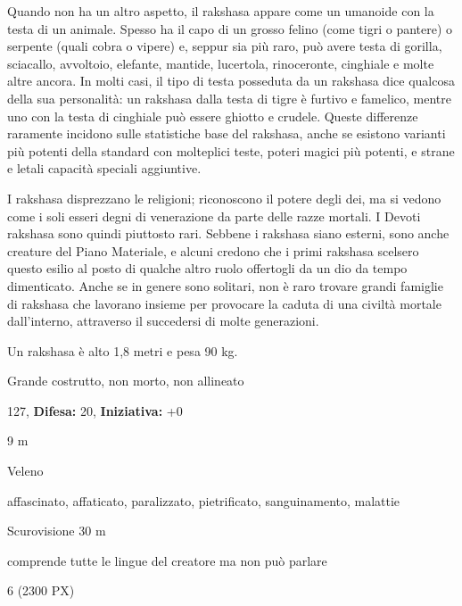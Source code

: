 \begin{multicols}{2}
{Quando non ha un altro aspetto, il rakshasa appare come un umanoide con la testa di un animale. Spesso ha il capo di un grosso felino (come tigri o pantere) o serpente (quali cobra o vipere) e, seppur sia più raro, può avere testa di gorilla, sciacallo, avvoltoio, elefante, mantide, lucertola, rinoceronte, cinghiale e molte altre ancora. In molti casi, il tipo di testa posseduta da un rakshasa dice qualcosa della sua personalità: un rakshasa dalla testa di tigre è furtivo e famelico, mentre uno con la testa di cinghiale può essere ghiotto e crudele. Queste differenze raramente incidono sulle statistiche base del rakshasa, anche se esistono varianti più potenti della standard con molteplici teste, poteri magici più potenti, e strane e letali capacità speciali aggiuntive.

I rakshasa disprezzano le religioni; riconoscono il potere degli dei, ma si vedono come i soli esseri degni di venerazione da parte delle razze mortali. I Devoti rakshasa sono quindi piuttosto rari. Sebbene i rakshasa siano esterni, sono anche creature del Piano Materiale, e alcuni credono che i primi rakshasa scelsero questo esilio al posto di qualche altro ruolo offertogli da un dio da tempo dimenticato. Anche se in genere sono solitari, non è raro trovare grandi famiglie di rakshasa che lavorano insieme per provocare la caduta di una civiltà mortale dall'interno, attraverso il succedersi di molte generazioni.

Un rakshasa è alto 1,8 metri e pesa 90 kg.

\noindent
\begin{description}[noitemsep, topsep=0pt, parsep=0pt, partopsep=0pt, leftmargin=0cm, labelwidth=2.2cm]
	\item[\textbf{Taglia/Tipo:}] Grande costrutto, non morto, non allineato
	\item[\textbf{Caratt.:}] 
	\item[\textbf{Punti Ferita:}] 127,  \textbf{Difesa:} 20,  \textbf{Iniziativa:} +0
	\item[\textbf{Movimento:}] 9 m
	\item[\textbf{Tiri Salvez.:}] 
	\item[\textbf{Imm. Danni:}] Veleno
	\item[\textbf{Immunità:}] affascinato, affaticato, paralizzato, pietrificato, sanguinamento, malattie
	\item[\textbf{Sensi:}] Scurovisione 30 m
	\item[\textbf{Linguaggi:}] comprende tutte le lingue del creatore ma non può parlare
	\item[\textbf{Sfida:}] 6 (2300 PX)\smallskip
\end{description}

}
\end{multicols}
